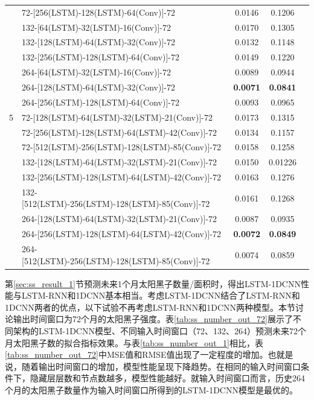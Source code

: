 \begin{table}[!htbp]
\begin{tabular}{clccc}
      & 72-[256(LSTM)-128(LSTM)-64(Conv)]-72 & 0.0146 & 0.1206 \\
      & 132-[64(LSTM)-32(LSTM)-16(Conv)]-72 & 0.0170 & 0.1305 \\
      & 132-[128(LSTM)-64(LSTM)-32(Conv)]-72 & 0.0132 & 0.1148 \\
      & 132-[256(LSTM)-128(LSTM)-64(Conv)]-72 & 0.0149 & 0.1220 \\
      & 264-[64(LSTM)-32(LSTM)-16(Conv)]-72 & 0.0089 & 0.0944 \\
      & 264-[128(LSTM)-64(LSTM)-32(Conv)]-72 & \textbf{0.0071} & \textbf{0.0841} \\
      & 264-[256(LSTM)-128(LSTM)-64(Conv)]-72 & 0.0093 & 0.0965 \\
    \hline
    5 & 72-[128(LSTM)-64(LSTM)-32(LSTM)-21(Conv)]-72 & 0.0173 & 0.1315 \\
      & 72-[256(LSTM)-128(LSTM)-64(LSTM)-42(Conv)]-72 & 0.0134 & 0.1157 \\
      & 72-[512(LSTM)-256(LSTM)-128(LSTM)-85(Conv)]-72 & 0.0158 & 0.1258 \\
      & 132-[128(LSTM)-64(LSTM)-32(LSTM)-21(Conv)]-72 & 0.0150 & 0.01226 \\
      & 132-[256(LSTM)-128(LSTM)-64(LSTM)-42(Conv)]-72 & 0.0163 & 0.1276 \\
      & 132-[512(LSTM)-256(LSTM)-128(LSTM)-85(Conv)]-72 & 0.0161 &  0.1268\\
      & 264-[128(LSTM)-64(LSTM)-32(LSTM)-21(Conv)]-72 & 0.0087 & 0.0935 \\
      & 264-[256(LSTM)-128(LSTM)-64(LSTM)-42(Conv)]-72 & \textbf{0.0072} & \textbf{0.0849} \\
      & 264-[512(LSTM)-256(LSTM)-128(LSTM)-85(Conv)]-72 & 0.0074 & 0.0859 \\
    \bottomrule
  \end{tabular}
\end{table}

第\ref{sec:ss_result_1}节预测未来1个月太阳黑子数量/面积时，得出LSTM-1DCNN性能与LSTM-RNN和1DCNN基本相当。考虑LSTM-1DCNN结合了LSTM-RNN和1DCNN两者的优点，以下试验不再考虑LSTM-RNN和1DCNN两种模型。本节讨论输出时间窗口为72个月的太阳黑子强度。表\ref{tab:ss_number_out_72}展示了不同架构的LSTM-1DCNN模型、不同输入时间窗口（72、132、264）预测未来72个月太阳黑子数的拟合指标效果。与表\ref{tab:ss_number_out_1}相比，表\ref{tab:ss_number_out_72}中MSE值和RMSE值出现了一定程度的增加。也就是说，随着输出时间窗口的增加，模型性能呈现下降趋势。在相同的输入时间窗口条件下，隐藏层层数和节点数越多，模型性能越好。就输入时间窗口而言，历史264个月的太阳黑子数量作为输入时间窗口所得到的LSTM-1DCNN模型是最优的。


